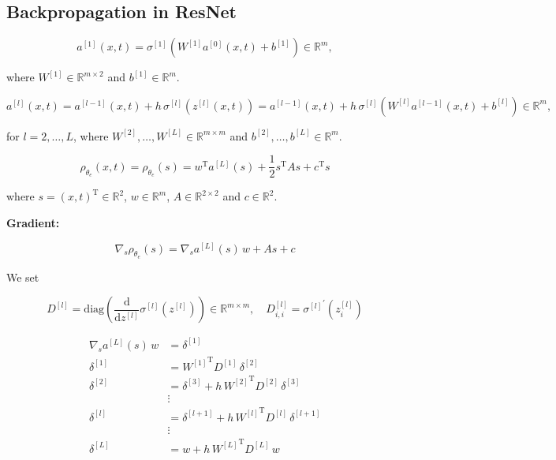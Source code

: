 \subsection{Backpropagation in ResNet}

\begin{equation*}
    a^{[1]}(x,t) = \sigma^{[1]} (W^{[1]} a^{[0]}(x,t) + b^{[1]}) \in \mathbb{R}^{m}, 
\end{equation*}

where $W^{[1]} \in \mathbb{R}^{m \times 2}$ and $b^{[1]} \in \mathbb{R}^{m}$.

\begin{equation*}
    a^{[l]}(x,t) = a^{[l-1]}(x,t) + h \, \sigma^{[l]} (z^{[l]}(x,t)) = a^{[l-1]}(x,t) + h \, \sigma^{[l]} (W^{[l]} a^{[l-1]}(x,t) + b^{[l]}) \in \mathbb{R}^{m}, 
\end{equation*}

for $l = 2, \ldots, L$, where $W^{[2]}, \ldots, W^{[L]} \in \mathbb{R}^{m \times m}$ and $b^{[2]}, \ldots, b^{[L]} \in \mathbb{R}^{m}$.

\begin{equation*}
    \rho_{\theta_e}(x, t) = \rho_{\theta_e}(s) = w^{\mathrm{T}} a^{[L]}(s) + \frac{1}{2} s^{\mathrm{T}} A s + c^{\mathrm{T}} s 
\end{equation*}

where $s = (x, t)^{\mathrm{T}} \in \mathbb{R}^{2}$, $w \in \mathbb{R}^{m}$, $A \in \mathbb{R}^{2 \times 2}$ and $c \in \mathbb{R}^2$.

\textbf{Gradient:}

\begin{equation*}
    \nabla_s \rho_{\theta_e}(s) = \nabla_s a^{[L]}(s) \, w + A s + c
\end{equation*}

We set

\begin{equation*}
    D^{[l]} = \mathrm{diag} \left( \frac{\mathrm{d}}{\mathrm{d}z^{[l]}} \sigma^{[l]} (z^{[l]}) \right) \in \mathbb{R}^{m \times m}, \quad D_{i, i}^{[l]} = {\sigma^{[l]}}^{\prime} (z_{i}^{[l]})
\end{equation*}

\begin{align*}
    \nabla_s a^{[L]}(s) \, w & = \delta^{[1]}  \\
    \delta^{[1]} & = {W^{[1]}}^{\mathrm{T}} D^{[1]} \, \delta^{[2]} \\
    \delta^{[2]} & = \delta^{[3]} + h \, {W^{[2]}}^{\mathrm{T}} D^{[2]} \, \delta^{[3]} \\
    &\vdots\\
    \delta^{[l]} & = \delta^{[l+1]} + h \, {W^{[l]}}^{\mathrm{T}} D^{[l]} \, \delta^{[l+1]} \\
    &\vdots\\
    \delta^{[L]} & = w + h \, {W^{[L]}}^{\mathrm{T}} D^{[L]} \, w
\end{align*}


